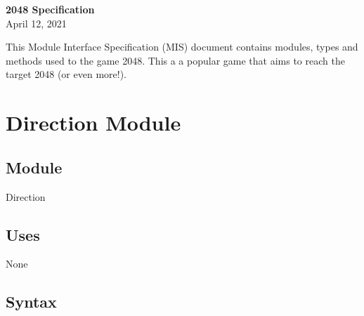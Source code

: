 \documentclass[12pt]{article}
\newcommand{\authornote}[3]{\textcolor{#1}{[#3 ---#2]}}
\newcommand{\authornote}[3]{}
\newcommand{\wss}[1]{\authornote{blue}{SS}{#1}}
\begin{document}
\begin{center}
\huge \textbf{2048 Specification}\\[4mm]
April 12, 2021
\end{center}

\newpage
This Module Interface Specification (MIS) document contains modules, types and
methods used to the game 2048. This a a popular game that aims to reach the target 2048 (or even more!).





% 
% 

\newpage

%

\section* {Direction Module}

\subsection*{Module}

Direction

\subsection* {Uses}

None

\subsection* {Syntax}
\end{document}
